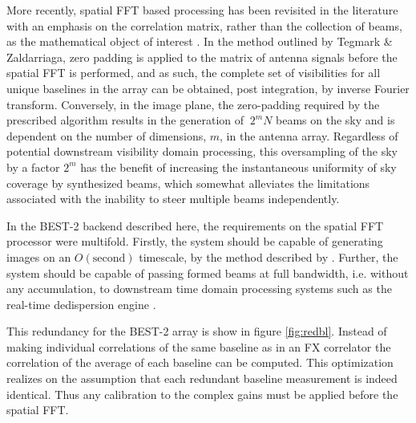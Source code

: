\documentclass[useAMS,macros,usenatbib,onecolumn]{mn2e}
\begin{document}
More recently, spatial FFT based processing has been revisited in the literature with an emphasis on the correlation matrix, rather than the collection of beams, as the mathematical object of interest \citep{fftt} \citep{omniscope}.
In the method outlined by Tegmark \& Zaldarriaga, zero padding is applied to the matrix of antenna signals before the spatial FFT is performed, and as such, the complete set of visibilities for all unique baselines in the array can be obtained, post integration, by inverse Fourier transform.
Conversely, in the image plane, the zero-padding required by the prescribed algorithm results in the generation of $~2^{m}N$ beams on the sky and is dependent on the number of dimensions, $m$, in the antenna array.
Regardless of potential downstream visibility domain processing, this oversampling of the sky by a factor $2^{m}$ has the benefit of increasing the instantaneous uniformity of sky coverage by synthesized beams, which somewhat alleviates the limitations associated with the inability to steer multiple beams independently.

In the BEST-2 backend described here, the requirements on the spatial FFT processor were multifold. Firstly, the system should be capable of generating images on an $O(\mathrm{second})$ timescale, by the method described by \citep{fftt}. Further, the system should be capable of passing formed beams at full bandwidth, i.e. without any accumulation, to downstream time domain processing systems such as the real-time dedispersion engine \citep{dedispersion}. 


This redundancy for the BEST-2 array is show in figure \ref{fig:redbl}.
Instead of making individual correlations of the same baseline as in an FX correlator the correlation of the average of each baseline can be computed.
This optimization realizes on the assumption that each redundant baseline measurement is indeed identical.
Thus any calibration to the complex gains must be applied before the spatial FFT.
\end{document}
